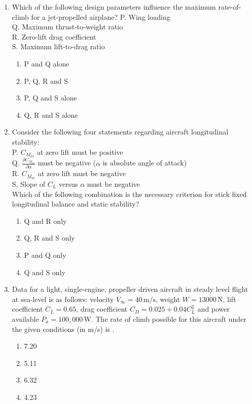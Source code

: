 \documentclass[journal]{IEEEtran}
\begin{document}
\begin{enumerate}
\item
Which of the following design parameters influence the maximum rate-of-climb for a jet-propelled airplane? 
P. Wing loading \\
Q. Maximum thrust-to-weight ratio \\
R. Zero-lift drag coefficient \\
S. Maximum lift-to-drag ratio \\[4pt]
\begin{enumerate}
    \item P and Q alone
    \item P, Q, R and S
    \item P, Q and S alone
    \item Q, R and S alone
\end{enumerate}
\hfill{}

\item 
Consider the following four statements regarding aircraft longitudinal stability: \\[4pt]
P. $C_{M_{ac}}$ at zero lift must be positive \\
Q. $\frac{\partial C_{M_{ac}}}{\partial \alpha}$ must be negative ($\alpha$ is absolute angle of attack) \\
R. $C_{M_{ac}}$ at zero lift must be negative \\
S. Slope of $C_L$ versus $\alpha$ must be negative \\[4pt]
Which of the following combination is the necessary criterion for stick fixed longitudinal balance and static stability? \\[4pt]
\begin{enumerate}
    \item Q and R only
    \item Q, R and S only
    \item P and Q only
    \item Q and S only
\end{enumerate}
\hfill{}

\item 
Data for a light, single-engine, propeller driven aircraft in steady level flight at sea-level is as follows: velocity $V_\infty = 40 \, \text{m/s}$, weight $W = 13000 \, \text{N}$, lift coefficient $C_L = 0.65$, drag coefficient $C_D = 0.025 + 0.04C_L^2$ and power available $P_a = 100{,}000 \, \text{W}$. The rate of climb possible for this aircraft under the given conditions (in m/s) is \underline{\hspace{1.5cm}}. \\[4pt]
\begin{enumerate}
    \item 7.20
    \item 5.11
    \item 6.32
    \item 4.23
\end{enumerate}
\hfill{}
\end{enumerate}
\end{document}
